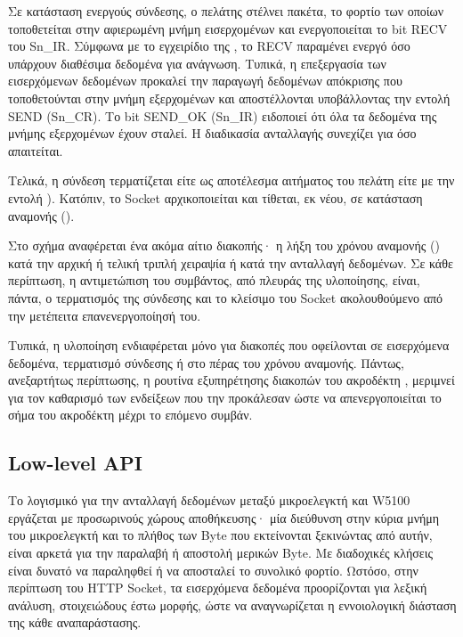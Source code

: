 Σε κατάσταση ενεργούς σύνδεσης, ο πελάτης στέλνει πακέτα, το φορτίο των οποίων
τοποθετείται στην αφιερωμένη μνήμη εισερχομένων και ενεργοποιείται το bit RECV
του Sn\_IR. Σύμφωνα με το εγχειρίδιο της \textcite[28]{wiz11:w5100}, το RECV
παραμένει ενεργό όσο υπάρχουν διαθέσιμα δεδομένα για ανάγνωση. Τυπικά, η
επεξεργασία των εισερχόμενων δεδομένων προκαλεί την παραγωγή δεδομένων απόκρισης
που τοποθετούνται στην μνήμη εξερχομένων και αποστέλλονται υποβάλλοντας την
εντολή SEND (Sn\_CR). Το bit SEND\_OK (Sn\_IR) ειδοποιεί ότι όλα τα δεδομένα της
μνήμης εξερχομένων έχουν σταλεί. Η διαδικασία ανταλλαγής συνεχίζει για όσο
απαιτείται.

Τελικά, η σύνδεση τερματίζεται είτε ως αποτέλεσμα αιτήματος του πελάτη είτε με
την εντολή ). Κατόπιν, το Socket αρχικοποιείται και τίθεται, εκ νέου,
σε κατάσταση αναμονής ().

Στο σχήμα αναφέρεται ένα ακόμα αίτιο διακοπής· η λήξη του χρόνου αναμονής
() κατά την αρχική ή τελική τριπλή χειραψία ή κατά την ανταλλαγή
δεδομένων. Σε κάθε περίπτωση, η αντιμετώπιση του συμβάντος, από πλευράς της
υλοποίησης, είναι, πάντα, ο τερματισμός της σύνδεσης και το κλείσιμο του Socket
ακολουθούμενο από την μετέπειτα επανενεργοποίησή του.

Τυπικά, η υλοποίηση ενδιαφέρεται μόνο για διακοπές που οφείλονται σε εισερχόμενα
δεδομένα, τερματισμό σύνδεσης ή στο πέρας του χρόνου αναμονής. Πάντως,
ανεξαρτήτως περίπτωσης, η ρουτίνα εξυπηρέτησης διακοπών του ακροδέκτη
, μεριμνεί για τον καθαρισμό των ενδείξεων που την προκάλεσαν ώστε να
απενεργοποιείται το σήμα του ακροδέκτη μέχρι το επόμενο συμβάν.


\subsection{Low-level API}

Το λογισμικό για την ανταλλαγή δεδομένων μεταξύ μικροελεγκτή και W5100 εργάζεται
με προσωρινούς χώρους αποθήκευσης· μία διεύθυνση στην κύρια μνήμη του
μικροελεγκτή και το πλήθος των Byte που εκτείνονται ξεκινώντας από αυτήν, είναι
αρκετά για την παραλαβή ή αποστολή μερικών Byte. Με διαδοχικές κλήσεις είναι
δυνατό να παραληφθεί ή να αποσταλεί το συνολικό φορτίο. Ωστόσο, στην περίπτωση
του HTTP Socket, τα εισερχόμενα δεδομένα προορίζονται για λεξική ανάλυση,
στοιχειώδους έστω μορφής, ώστε να αναγνωρίζεται η εννοιολογική διάσταση της κάθε
αναπαράστασης.


